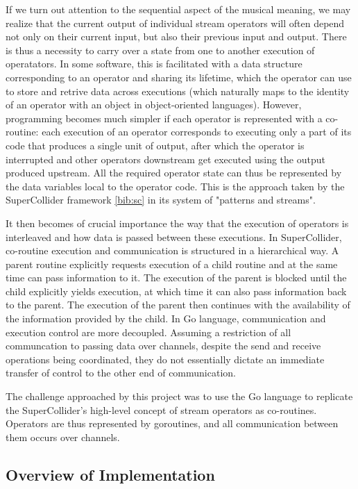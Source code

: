 \documentclass {article}
\begin{document}
If we turn out attention to the sequential aspect of the musical meaning, we may
realize that the current output of individual stream operators will often depend
not only on their current input, but also their previous input and output. There
is thus a necessity to carry over a state from one to another execution of
operatators. In some software, this is facilitated with a data structure
corresponding to an operator and sharing its lifetime, which the operator can
use to store and retrive data across executions (which naturally maps to the
identity of an operator with an object in object-oriented languages). However,
programming becomes much simpler if each operator is represented with a
co-routine: each execution of an operator corresponds to executing only a part
of its code that produces a single unit of output, after which the operator is
interrupted and other operators downstream get executed using the output
produced upstream. All the required operator state can thus be represented by
the data
variables local to the operator code. This is the approach taken by the
SuperCollider framework \ref{bib:sc} in its system of "patterns and streams".

It then becomes of crucial importance the way that the execution of operators is
interleaved and how data is passed between these executions. In SuperCollider,
co-routine execution and communication is structured in a hierarchical way. A
parent routine explicitly requests execution of a child routine and at the same
time can pass information to it. The execution of the parent is blocked until
the child explicitly yields execution, at which time it can also pass
information back to the parent. The execution of the parent then continues with
the availability of the information provided by the child. In Go language,
communication and execution control are more decoupled. Assuming a restriction
of all communcation to passing data over channels, despite the send and receive
operations being coordinated, they do not essentially dictate an immediate
transfer of control to the other end of communication.

The challenge approached by this project was to use the Go language to replicate
the SuperCollider's high-level concept of stream operators as co-routines.
Operators are thus represented by goroutines, and all communication between them
occurs over channels.

\subsection{Overview of Implementation}
\end{document}
